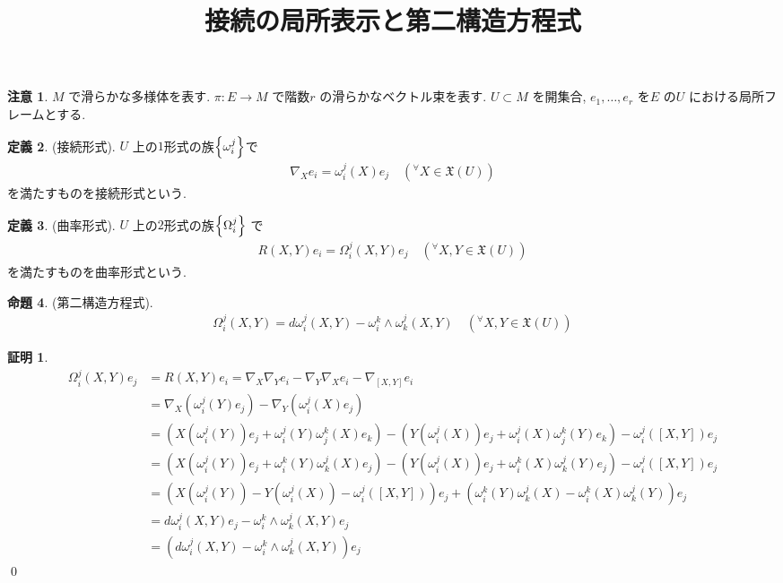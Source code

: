 \documentclass[10pt, fleqn, label-section=none]{bxjsarticle}
\title{接続の局所表示と第二構造方程式}
\date{}
\author{}
\theoremstyle{definition}
\newtheorem{dfn}{定義}[section]
\newtheorem{prop}[dfn]{命題}
\newtheorem*{pf*}{証明}
\newtheorem{remark}[dfn]{注意}
\newcommand{\any}{{}^{\forall}}
\newcommand{\cbra}[1]{\mleft\{#1\mright\}}
\renewcommand{\;}{\, ; \,}
\begin{document}
\maketitle



\section{}

\begin{remark}
$M$ で滑らかな多様体を表す. $\pi: E \rightarrow M$ で階数$r$ の滑らかなベクトル束を表す. $U \subset M$ を開集合, $e_1, \ldots, e_r$ を$E$ の$U$ における局所フレームとする. 
\end{remark}

\begin{dfn}(接続形式).
$U$ 上の$1$形式の族$\cbra{\omega_i^j}$で
\begin{align*} \nabla_X e_i = \omega_i^j (X) e_j \quad (\any X \in \mathfrak X (U))\end{align*}
を満たすものを接続形式という.
\end{dfn}

\begin{dfn}(曲率形式). 
$U$ 上の$2$形式の族$\cbra{\Omega_i^j}$ で
\begin{align*} R(X,Y)e_i = \Omega_i^j(X,Y) e_j \quad (\any X, Y \in \mathfrak X (U))\end{align*}
を満たすものを曲率形式という. 
\end{dfn}

\begin{prop}(第二構造方程式).
\begin{align*} \Omega_i^j (X,Y) = d\omega_i^j (X,Y) - \omega_i^k \wedge \omega_k^j (X,Y) \quad (\any X, Y \in \mathfrak X (U)) \end{align*}
\end{prop}
\begin{pf*}
\begin{align*} \Omega_i^j (X,Y) e_j &= R(X, Y) e_i = \nabla_X \nabla_Y e_i - \nabla_Y \nabla_X e_i - \nabla_{[X,Y]} e_i \\&= \nabla_X (\omega_i^j(Y) e_j) - \nabla_Y (\omega_i^j (X) e_j) 
\\&= (  X(\omega_i^j(Y)) e_j + \omega_i^j (Y) \omega_j^k (X) e_k   ) - (Y(\omega _i^j (X)) e_j  + \omega_i^j (X) \omega_j^k (Y) e_k  )  - \omega _i^j ([X,Y]) e_j
\\&= (  X(\omega_i^j(Y)) e_j + \omega_i^k (Y) \omega_k^j (X) e_j   ) - (Y(\omega _i^j (X)) e_j  + \omega_i^k (X) \omega_k^j (Y) e_j  )  - \omega _i^j ([X,Y]) e_j  
\\&= (  X(\omega_i^j(Y)) - Y(\omega _i^j (X))  -   \omega _i^j ([X,Y])  ) e_j + ( \omega_i^k (Y) \omega_k^j (X) - \omega_i^k (X) \omega_k^j (Y) ) e_j  
\\&= d\omega_i^j (X,Y) e_j - \omega_i^k \wedge \omega_k^j (X,Y) e_j 
\\&= (d\omega_i^j (X,Y)  - \omega_i^k \wedge \omega_k^j (X,Y) )e_j \end{align*}
\qed
\end{pf*}
\end{document}
